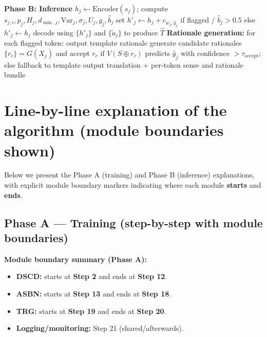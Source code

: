 \documentclass[11pt]{article}
\begin{document}
\begin{algorithm}
\begin{algorithmic}[1]

\State \textbf{Phase B: Inference}
    \State $h_j\leftarrow\mathrm{Encoder}(s_j)$; compute $s_{j,i},p_j,H_j,d_{\min,j},\mathrm{Var}_j,\sigma_j,U_j,g_j,\hat b_j$
    \State set $h'_j\leftarrow h_j + c_{w_j,\hat y_j}$ if flagged / $\hat b_j>0.5$ else $h'_j\leftarrow h_j$
  \EndFor
  \State decode using $\{h'_j\}$ and $\{\tilde a_j\}$ to produce $\hat T$
  \State \textbf{Rationale generation:} for each flagged token:
     output template rationale
    \Else generate candidate rationales $\{r_c\}=G(X_j)$ and accept $r_c$ if $V(S\oplus r_c)$ predicts $\hat y_j$ with confidence $>\tau_{\text{accept}}$; else fallback to template
    \EndIf
  \State output translation + per-token sense and rationale bundle
\EndFor
\end{algorithmic}
\end{algorithm}

\newpage
\section{Line-by-line explanation of the algorithm (module boundaries shown)}
Below we present the Phase A (training) and Phase B (inference) explanations, with explicit module boundary markers indicating where each module \textbf{starts} and \textbf{ends}.

\subsection{Phase A — Training (step-by-step with module boundaries)}
\textbf{Module boundary summary (Phase A):}
\begin{itemize}
  \item \textbf{DSCD:} starts at \textbf{Step 2} and ends at \textbf{Step 12}.
  \item \textbf{ASBN:} starts at \textbf{Step 13} and ends at \textbf{Step 18}.
  \item \textbf{TRG:} starts at \textbf{Step 19} and ends at \textbf{Step 20}.
  \item \textbf{Logging/monitoring:} Step 21 (shared/afterwards).
\end{itemize}
\end{document}
